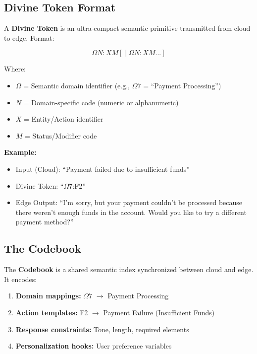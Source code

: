 \documentclass{article}
\begin{document}
\subsection{Divine Token Format}

A \textbf{Divine Token} is an ultra-compact semantic primitive transmitted from cloud to edge. Format:

\begin{equation}
\Omega N:XM[\;|\;\Omega N:XM...]
\end{equation}

Where:
\begin{itemize}
    \item $\Omega$ = Semantic domain identifier (e.g., $\Omega$7 = ``Payment Processing'')
    \item $N$ = Domain-specific code (numeric or alphanumeric)
    \item $X$ = Entity/Action identifier
    \item $M$ = Status/Modifier code
\end{itemize}

\textbf{Example:}
\begin{itemize}
    \item Input (Cloud): ``Payment failed due to insufficient funds''
    \item Divine Token: ``$\Omega$7:F2''
    \item Edge Output: ``I'm sorry, but your payment couldn't be processed because there weren't enough funds in the account. Would you like to try a different payment method?''
\end{itemize}

\subsection{The Codebook}

The \textbf{Codebook} is a shared semantic index synchronized between cloud and edge. It encodes:

\begin{enumerate}
    \item \textbf{Domain mappings:} $\Omega$7 $\rightarrow$ Payment Processing
    \item \textbf{Action templates:} F2 $\rightarrow$ Payment Failure (Insufficient Funds)
    \item \textbf{Response constraints:} Tone, length, required elements
    \item \textbf{Personalization hooks:} User preference variables
\end{enumerate}
\end{document}
